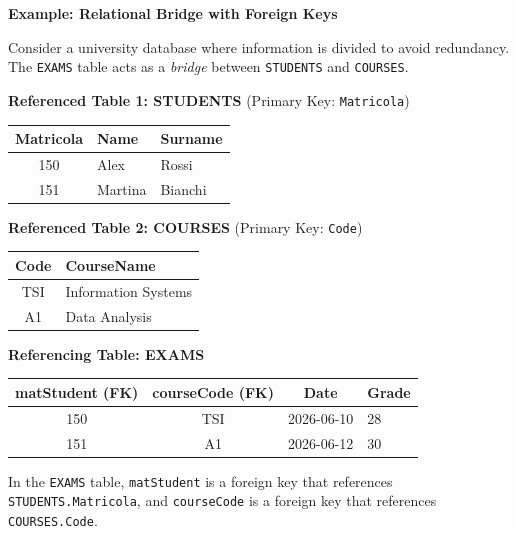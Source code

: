 \vspace{0.2cm}
\begin{example}{\textbf{Example: Relational Bridge with Foreign Keys}}

Consider a university database where information is divided to avoid redundancy. The \texttt{EXAMS} table acts as a \textit{bridge} between \texttt{STUDENTS} and \texttt{COURSES}.

\pagebreak

\textbf{Referenced Table 1: STUDENTS} (Primary Key: \texttt{Matricola})
\begin{center}
\begin{tabular}{|c|l|l|}
\hline
\textbf{Matricola} & \textbf{Name} & \textbf{Surname} \\
\hline
150 & Alex & Rossi \\
151 & Martina & Bianchi \\
\hline
\end{tabular}
\end{center}

\vspace{0.3cm}
\textbf{Referenced Table 2: COURSES} (Primary Key: \texttt{Code})
\begin{center}
\begin{tabular}{|c|l|}
\hline
\textbf{Code} & \textbf{CourseName} \\
\hline
TSI & Information Systems \\
A1 & Data Analysis \\
\hline
\end{tabular}
\end{center}

\vspace{0.3cm}
\textbf{Referencing Table: EXAMS}
\begin{center}
\begin{tabular}{|c|c|c|l|}
\hline
\textbf{matStudent (FK)} & \textbf{courseCode (FK)} & \textbf{Date} & \textbf{Grade} \\
\hline
150 & TSI & 2026-06-10 & 28 \\
151 & A1  & 2026-06-12 & 30 \\
\hline
\end{tabular}
\end{center}

\vs
In the \texttt{EXAMS} table, \texttt{matStudent} is a foreign key that references \texttt{STUDENTS.Matricola}, and \texttt{courseCode} is a foreign key that references \texttt{COURSES.Code}.
\end{example}

